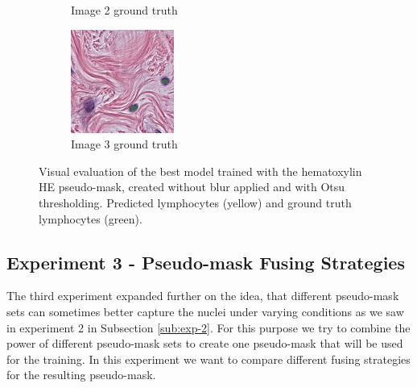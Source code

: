 \begin{figure}[H]
\begin{subfigure}[b]{0.32\textwidth}
    \caption{Image 2 ground truth}
  \end{subfigure}\hfill
  \begin{subfigure}[b]{0.32\textwidth}
    \centering
    \includegraphics[width=\linewidth]{assets/images/for_presentation/exp2-3-gt.png}
    \caption{Image 3 ground truth}
  \end{subfigure}
  \caption{Visual evaluation of the best model trained with the hematoxylin HE pseudo-mask, created without blur applied and with Otsu thresholding. Predicted lymphocytes (yellow) and ground truth lymphocytes (green).}
  \label{fig:exp2-results}
\end{figure}

\subsection{Experiment 3 - Pseudo-mask Fusing Strategies}
\label{sub:exp-3}
The third experiment expanded further on the idea, that different pseudo-mask sets can sometimes better capture the nuclei under varying conditions as we saw in experiment 2 in Subsection \ref{sub:exp-2}. For this purpose we try to combine the power of different pseudo-mask sets to create one pseudo-mask that will be used for the training. In this experiment we want to compare different fusing strategies for the resulting pseudo-mask.

